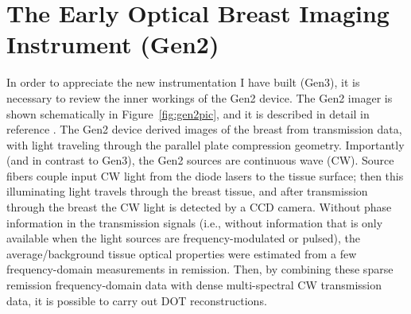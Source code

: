 \section{The Early Optical Breast Imaging Instrument (Gen2)}
In order to appreciate the new instrumentation I have built (Gen3), it is necessary to review the inner workings of the Gen2 device. The Gen2 imager is shown schematically in Figure~\ref{fig:gen2pic}, and it is described in detail in reference \cite{Choe2005a,Choe2009}. The Gen2 device derived images of the breast from transmission data, with light traveling through the parallel plate compression geometry. Importantly (and in contrast to Gen3), the Gen2 sources are continuous wave (CW). Source fibers couple input CW light from the diode lasers to the tissue surface; then this illuminating light travels through the breast tissue, and after transmission through the breast the CW light is detected by a CCD camera. Without phase information in the transmission signals (i.e., without information that is only available when the light sources are frequency-modulated or pulsed), the average/background tissue optical properties were estimated from a few frequency-domain measurements in remission. Then, by combining these sparse remission frequency-domain data with dense multi-spectral CW transmission data, it is possible to carry out DOT reconstructions.

